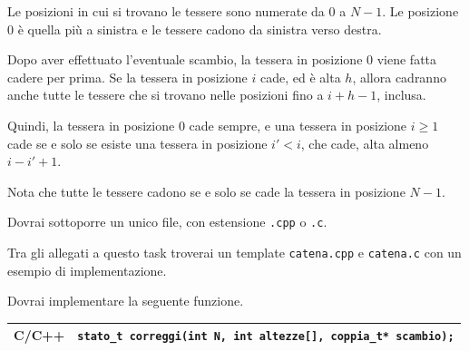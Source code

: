 \begin{mdframed}[backgroundcolor=black!10,rightline=false,leftline=false]

\Specs

\small

Le posizioni in cui si trovano le tessere sono numerate da $0$ a $N-1$.
Le posizione $0$ è quella più a sinistra e
le tessere cadono da sinistra verso destra.

Dopo aver effettuato l'eventuale scambio,
la tessera in posizione $0$ viene fatta cadere per prima.
Se la tessera in posizione $i$ cade,
ed è alta $h$,
allora cadranno anche tutte le tessere che si trovano nelle
posizioni fino a $i+h-1$, inclusa.

Quindi, la tessera in posizione $0$ cade sempre,
e una tessera in posizione $i \geq 1$
cade se e solo se esiste una tessera
in posizione $i' < i$,
che cade, alta almeno $i-i'+1$.

Nota che tutte le tessere cadono
se e solo se cade la tessera in posizione $N-1$.

\end{mdframed}

\pagebreak


\Implementation

Dovrai sottoporre un unico file, con estensione \texttt{.cpp} o \texttt{.c}.

\begin{warning}
Tra gli allegati a questo task troverai un template \texttt{catena.cpp} e \texttt{catena.c}
con un esempio di implementazione.
\end{warning}

Dovrai implementare la seguente funzione.

\begin{center}\begin{tabularx}{\textwidth}{|c|X|}
\hline
C/C++  & \verb|stato_t correggi(int N, int altezze[], coppia_t* scambio);|\\
\hline
\end{tabularx}\end{center}

